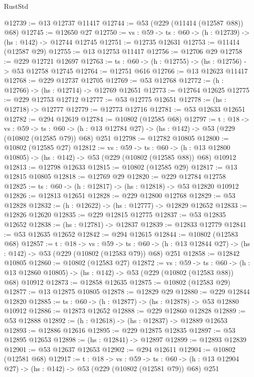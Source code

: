 \begin{lexlean}{RustStd}
\begin{coremodule}
@12739 := @13 @12737 @11417
@12744 := @53 (@229 (@11414 (@12587 @88)) @68)
@12745 := @12650 @27
@12750 := {vs : @59} -> {ts : @60} -> (h : @12739) -> (hs : @142) -> @12744 @12745
@12751 := @12735 @12631
@12753 := @11414 (@12587 @29)
@12755 := @13 @12753 @11417
@12756 := @12706 @29
@12758 := @229 @12721 @12697
@12763 := {ts : @60} -> (h : @12755) -> (hs : @12756) -> @53 @12758 @12745
@12764 := @12751 @616
@12766 := @13 @12623 @11417
@12768 := @229 @12737 @12705
@12769 := @53 @12768
@12772 := (h : @12766) -> (hs : @12714) -> @12769 @12651
@12773 := @12764 @12625
@12775 := @229 @12753 @12712
@12777 := @53 @12775 @12651
@12778 := (hs : @12718) -> @12777
@12779 := @12773 @12716
@12781 := @53 @12633 @12651
@12782 := @294 @12619
@12784 := @10802 (@12585 @68)
@12797 := {t : @18} ->
  {vs : @59} ->
  {ts : @60} -> (h : @13 @12784 @27) -> (hs : @142) -> @53 (@229 (@10802 (@12585 @79)) @68) @251
@12798 := @12782 @10805
@12800 := @10802 (@12585 @27)
@12812 := {vs : @59} ->
  {ts : @60} ->
  (h : @13 @12800 @10805) -> (hs : @142) -> @53 (@229 (@10802 (@12585 @88)) @68) @10912
@12813 := @12798 @12633
@12815 := @10802 (@12585 @29)
@12817 := @13 @12815 @10805
@12818 := @12769 @29
@12820 := @229 @12784 @12758
@12825 := {ts : @60} -> (h : @12817) -> (hs : @12818) -> @53 @12820 @10912
@12826 := @12813 @12651
@12828 := @229 @12800 @12768
@12829 := @53 @12828
@12832 := (h : @12622) -> (hs : @12777) -> @12829 @12652
@12833 := @12826 @12620
@12835 := @229 @12815 @12775
@12837 := @53 @12835 @12652
@12838 := (hs : @12781) -> @12837
@12839 := @12833 @12779
@12841 := @53 @12635 @12652
@12842 := @294 @12615
@12844 := @10802 (@12583 @68)
@12857 := {t : @18} ->
  {vs : @59} ->
  {ts : @60} -> (h : @13 @12844 @27) -> (hs : @142) -> @53 (@229 (@10802 (@12583 @79)) @68) @251
@12858 := @12842 @10805
@12860 := @10802 (@12583 @27)
@12872 := {vs : @59} ->
  {ts : @60} ->
  (h : @13 @12860 @10805) -> (hs : @142) -> @53 (@229 (@10802 (@12583 @88)) @68) @10912
@12873 := @12858 @12635
@12875 := @10802 (@12583 @29)
@12877 := @13 @12875 @10805
@12878 := @12829 @29
@12880 := @229 @12844 @12820
@12885 := {ts : @60} -> (h : @12877) -> (hs : @12878) -> @53 @12880 @10912
@12886 := @12873 @12652
@12888 := @229 @12860 @12828
@12889 := @53 @12888
@12892 := (h : @12618) -> (hs : @12837) -> @12889 @12653
@12893 := @12886 @12616
@12895 := @229 @12875 @12835
@12897 := @53 @12895 @12653
@12898 := (hs : @12841) -> @12897
@12899 := @12893 @12839
@12901 := @53 @12637 @12653
@12902 := @294 @12611
@12904 := @10802 (@12581 @68)
@12917 := {t : @18} ->
  {vs : @59} ->
  {ts : @60} -> (h : @13 @12904 @27) -> (hs : @142) -> @53 (@229 (@10802 (@12581 @79)) @68) @251

\end{coremodule}
\end{lexlean}
